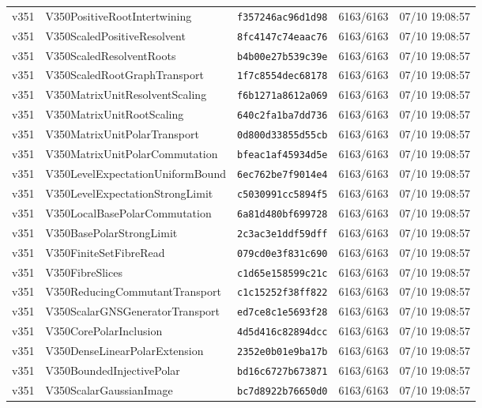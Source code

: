 \documentclass[11pt]{article}
\theoremstyle{definition}\newtheorem{deriv}{Derivação}
\begin{document}
{\begin{longtable}{@{}lllll@{}}
v351 & V350PositiveRootIntertwining & \texttt{f357246ac96d1d98} & 6163/6163 & 07/10 19:08:57 \\
v351 & V350ScaledPositiveResolvent & \texttt{8fc4147c74eaac76} & 6163/6163 & 07/10 19:08:57 \\
v351 & V350ScaledResolventRoots & \texttt{b4b00e27b539c39e} & 6163/6163 & 07/10 19:08:57 \\
v351 & V350ScaledRootGraphTransport & \texttt{1f7c8554dec68178} & 6163/6163 & 07/10 19:08:57 \\
v351 & V350MatrixUnitResolventScaling & \texttt{f6b1271a8612a069} & 6163/6163 & 07/10 19:08:57 \\
v351 & V350MatrixUnitRootScaling & \texttt{640c2fa1ba7dd736} & 6163/6163 & 07/10 19:08:57 \\
v351 & V350MatrixUnitPolarTransport & \texttt{0d800d33855d55cb} & 6163/6163 & 07/10 19:08:57 \\
v351 & V350MatrixUnitPolarCommutation & \texttt{bfeac1af45934d5e} & 6163/6163 & 07/10 19:08:57 \\
v351 & V350LevelExpectationUniformBound & \texttt{6ec762be7f9014e4} & 6163/6163 & 07/10 19:08:57 \\
v351 & V350LevelExpectationStrongLimit & \texttt{c5030991cc5894f5} & 6163/6163 & 07/10 19:08:57 \\
v351 & V350LocalBasePolarCommutation & \texttt{6a81d480bf699728} & 6163/6163 & 07/10 19:08:57 \\
v351 & V350BasePolarStrongLimit & \texttt{2c3ac3e1ddf59dff} & 6163/6163 & 07/10 19:08:57 \\
v351 & V350FiniteSetFibreRead & \texttt{079cd0e3f831c690} & 6163/6163 & 07/10 19:08:57 \\
v351 & V350FibreSlices & \texttt{c1d65e158599c21c} & 6163/6163 & 07/10 19:08:57 \\
v351 & V350ReducingCommutantTransport & \texttt{c1c15252f38ff822} & 6163/6163 & 07/10 19:08:57 \\
v351 & V350ScalarGNSGeneratorTransport & \texttt{ed7ce8c1e5693f28} & 6163/6163 & 07/10 19:08:57 \\
v351 & V350CorePolarInclusion & \texttt{4d5d416c82894dcc} & 6163/6163 & 07/10 19:08:57 \\
v351 & V350DenseLinearPolarExtension & \texttt{2352e0b01e9ba17b} & 6163/6163 & 07/10 19:08:57 \\
v351 & V350BoundedInjectivePolar & \texttt{bd16c6727b673871} & 6163/6163 & 07/10 19:08:57 \\
v351 & V350ScalarGaussianImage & \texttt{bc7d8922b76650d0} & 6163/6163 & 07/10 19:08:57 \\

\end{longtable}}
\end{document}

